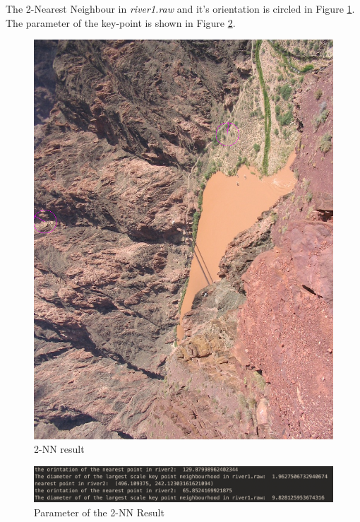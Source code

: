 \documentclass[11pt]{article}
\begin{document}
The 2-Nearest Neighbour in {\it river1.raw} and it's orientation is circled in Figure \ref{2nn_river2}. The parameter of the key-point is shown in Figure \ref{2nnpara}.\par
\begin{figure}[!htp]
	\centering
	\includegraphics[scale=0.2]{2nn_river2.png}
	\caption{ 2-NN result}
	\label{2nn_river2}
	\end{figure}
	
\begin{figure}[!htp]
	\centering
	\includegraphics[scale=0.3]{2nnpara.png}
	\caption{ Parameter of the 2-NN Result}
	\label{2nnpara}
	\end{figure}
	
\end{document}
